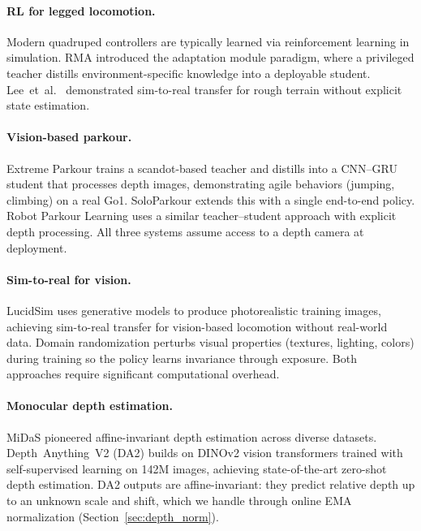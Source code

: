 \documentclass[10pt,twocolumn]{article}
\begin{document}
\paragraph{RL for legged locomotion.}
Modern quadruped controllers are typically learned via reinforcement
learning in simulation.  RMA \cite{kumar2021rma} introduced the
adaptation module paradigm, where a privileged teacher distills
environment-specific knowledge into a deployable student.
Lee~et~al.~\cite{lee2020learning} demonstrated sim-to-real transfer
for rough terrain without explicit state estimation.

\paragraph{Vision-based parkour.}
Extreme Parkour \cite{cheng2023parkour} trains a scandot-based teacher
and distills into a CNN--GRU student that processes depth images,
demonstrating agile behaviors (jumping, climbing) on a real Go1.
SoloParkour \cite{chane2025soloparkour} extends this with a
single end-to-end policy.  Robot Parkour Learning
\cite{zhuang2023robot} uses a similar teacher--student approach with
explicit depth processing.  All three systems assume access to a
depth camera at deployment.

\paragraph{Sim-to-real for vision.}
LucidSim \cite{yu2024lucidsim} uses generative models to produce
photorealistic training images, achieving sim-to-real transfer for
vision-based locomotion without real-world data.  Domain
randomization \cite{tobin2017domain} perturbs visual properties
(textures, lighting, colors) during training so the policy learns
invariance through exposure.  Both approaches require significant
computational overhead.

\paragraph{Monocular depth estimation.}
MiDaS \cite{ranftl2020towards} pioneered affine-invariant depth
estimation across diverse datasets.  Depth~Anything~V2 (DA2)
\cite{yang2024depth} builds on DINOv2 \cite{oquab2023dinov2}
vision transformers trained with self-supervised learning on 142M
images, achieving state-of-the-art zero-shot depth estimation.  DA2
outputs are affine-invariant: they predict relative depth up to an
unknown scale and shift, which we handle through online EMA
normalization (Section~\ref{sec:depth_norm}).
\end{document}
